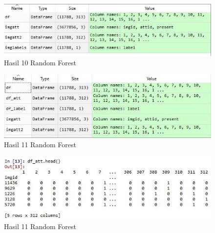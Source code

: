 \begin{figure}[ht]
	\centerline{\includegraphics[width=1\textwidth]{figures/huda/chapter3_praktek/13.JPG}}
	\caption{Hasil 10 Random Forest}
	\label{h17}
\end{figure}

\begin{figure}[ht]
	\centerline{\includegraphics[width=1\textwidth]{figures/huda/chapter3_praktek/14.JPG}}
	\caption{Hasil 11 Random Forest}
	\label{h18}
\end{figure}

\begin{figure}[ht]
	\centerline{\includegraphics[width=1\textwidth]{figures/huda/chapter3_praktek/15.JPG}}
	\caption{Hasil 11 Random Forest}
	\label{h19}
\end{figure}

